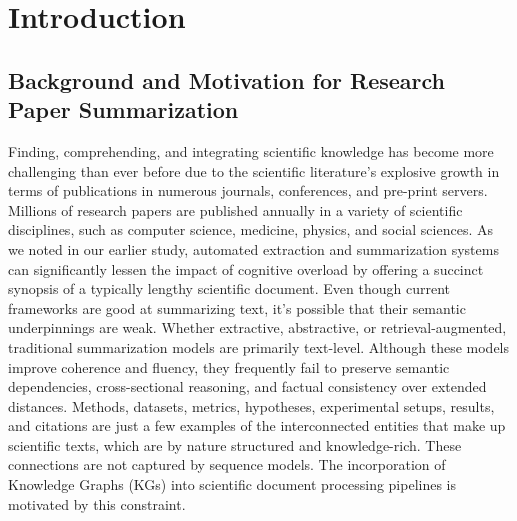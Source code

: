\documentclass[conference]{IEEEtran}
\begin{document}

\section{Introduction}

\subsection{Background and Motivation for Research Paper Summarization}
Finding, comprehending, and integrating scientific knowledge has become more challenging than ever before due to the scientific literature's explosive growth in terms of publications in numerous journals, conferences, and pre-print servers. Millions of research papers are published annually in a variety of scientific disciplines, such as computer science, medicine, physics, and social sciences. As we noted in our earlier study, automated extraction and summarization systems can significantly lessen the impact of cognitive overload by offering a succinct synopsis of a typically lengthy scientific document. Even though current frameworks are good at summarizing text, it's possible that their semantic underpinnings are weak.
Whether extractive, abstractive, or retrieval-augmented, traditional summarization models are primarily text-level. Although these models improve coherence and fluency, they frequently fail to preserve semantic dependencies, cross-sectional reasoning, and factual consistency over extended distances. Methods, datasets, metrics, hypotheses, experimental setups, results, and citations are just a few examples of the interconnected entities that make up scientific texts, which are by nature structured and knowledge-rich. These connections are not captured by sequence models.
The incorporation of Knowledge Graphs (KGs) into scientific document processing pipelines is motivated by this constraint.
\end{document}
